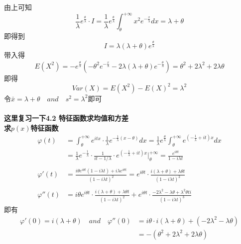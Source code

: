 \documentclass[a4paper]{ctexart}    %
\begin{document}
	由上可知
	\begin{equation*}
		\frac{1}{\lambda} e^{\frac{\theta}{\lambda}} \cdot I = \frac{1}{\lambda} e^{\frac{\theta}{\lambda}} \int_{\theta}^{+\infty} x^2e^{-\frac{x}{\lambda}}dx = \lambda + \theta 
	\end{equation*}
	即得到
	\begin{equation*}
		I = \lambda (\lambda + \theta) e^{\frac{\theta}{\lambda}}
	\end{equation*}
	带入得
	\begin{equation*}
		E(X^2) = -e^{\frac{\theta}{\lambda}} \left(-\theta^2e^{-\frac{x}{\lambda}} - 2 \lambda (\lambda + \theta) e^{-\frac{\theta}{\lambda}} \right) = \theta^2 + 2\lambda^2 + 2\lambda\theta
	\end{equation*}
	即得
	\begin{equation*}
		Var(X) = E(X^2) - E(X)^2 = \lambda^2
	\end{equation*}
	令$ \bar{x} = \lambda + \theta \quad and \quad s^2 = \lambda^2 $即可\\
	\\
	\textbf{这里复习一下4.2 特征函数求均值和方差}\\
	\textbf{求$ p(x) $特征函数}
	\begin{equation*}
		\begin{split}
			\varphi(t) &= \int_{\theta}^{+\infty} e^{itx} \cdot \frac{1}{\lambda} e^{-\frac{1}{\lambda}(x - \theta)}dx = \frac{1}{\lambda}e^{\frac{\theta}{\lambda}}\int_{\theta}^{+\infty} e^{(-\frac{1}{\lambda}+it)x}dx \\
			&= \frac{1}{\lambda} e^{-\frac{1}{\lambda}} \cdot \frac{1}{it-1/\lambda} \cdot e^{(-\frac{1}{\lambda}+it)x}\bigg|_{\theta}^{+\infty} = \frac{e^{i\theta t}}{1-i\lambda t} \\
			&\\
			\varphi'(t) &= \frac{i\theta e^{i\theta t}(1-i\lambda t) + i\lambda e^{i\theta t}}{(1-i\lambda t)^2} = e^{i\theta t} \cdot \frac{i(\lambda + \theta) + \lambda \theta t}{(1-i\lambda t)^2} \\
			&\\
			\varphi''(t) &= i\theta e^{i\theta t} \cdot \frac{i(\lambda + \theta) + \lambda \theta t}{(1-i\lambda t)^2} + e^{i\theta t} \cdot \frac{-2\lambda^2 - \lambda \theta + \lambda^2\theta ti}{(1-i\lambda t)^3}
		\end{split}
	\end{equation*}
	即有
	\begin{equation*}
		\begin{split}
			\varphi'(0) = i(\lambda + \theta) \quad and \quad 
			\varphi''(0) &= i\theta \cdot i(\lambda + \theta) + (-2\lambda^2 - \lambda \theta) \\
			& = -(\theta^2 + 2\lambda^2 + 2\lambda\theta)
		\end{split}
	\end{equation*}
\end{document}

